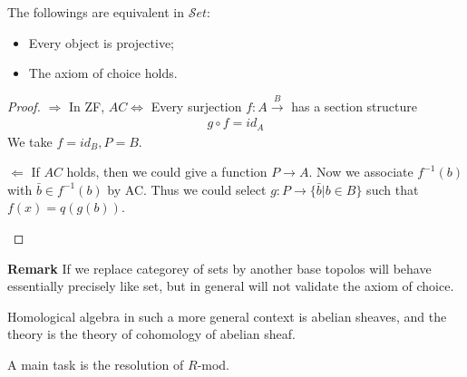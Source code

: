 \documentclass[Total.tex]{subfiles}
\begin{document}
			\begin{proposition}
				The followings are equivalent in $\mathcal Set$:
				\begin{itemize}
					\item Every object is projective;
					\item The axiom of choice holds.
				\end{itemize}
			\end{proposition}
			\begin{proof}
				$\Rightarrow$ In ZF, $AC\Leftrightarrow$ Every surjection $f:A\xrightarrow B$ has a section structure
				\begin{gather*}
					g\circ f=id_A
				\end{gather*} 
				We take $f=id_B,P=B$.
				
				$\Leftarrow$ If $AC$ holds, then we could give a function $P\rightarrow A$. Now we associate $f^{-1}(b)$ with $\bar{b}\in f^{-1}(b)$ by AC. Thus we could select $g:P\rightarrow \{\bar{b}|b\in B\}$ such that $f(x)=q(g(b))$.
				\begin{center}
				\end{center}
			\end{proof}
			
			\textbf{Remark} If we replace categorey of sets by another base topolos will behave essentially precisely like set, but in general will not validate the axiom of choice. 
			
			Homological algebra in such a more general context is abelian sheaves, and the theory is the theory of cohomology of abelian sheaf.
			
			A main task is the resolution of $R$-mod.
			
\end{document}
